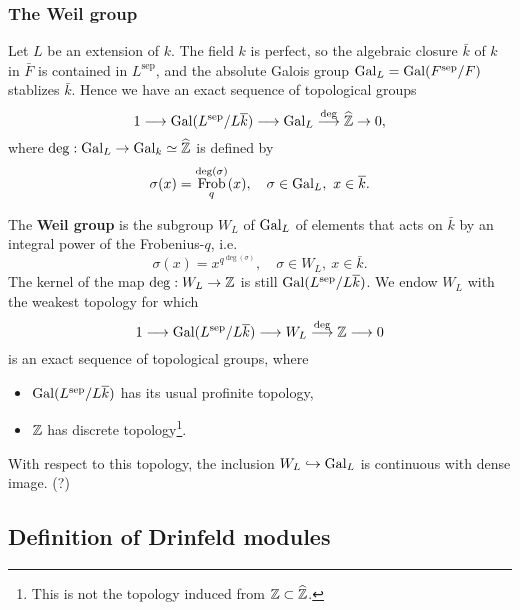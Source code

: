 \documentclass{article}
\newcommand{\sep}{\mathrm{sep}}
\DeclareMathOperator{\frob}{Frob}
\begin{document}
\subsubsection{The Weil group}
Let $L$ be an extension of $k$.
The field $k$ is perfect,
so the algebraic closure $\bar k$ of $k$ in $\bar F$ is contained in $L^\sep$,
and the absolute Galois group $\gal_L = \gal(F^\sep/F)$ stablizes $\bar k$.
Hence we have
an exact sequence of topological groups
\[1\longrightarrow\gal(L^\sep/L\bar{k})\longrightarrow \gal_L\stackrel{\deg}{\longrightarrow}\hat\Z\to 0,\]
where $\deg : \operatorname{Gal}_L\to \operatorname{Gal}_k\simeq\widehat{\mathbb{Z}}$ is defined by
\[\sigma(x) = \frob_q^{\deg(\sigma)}(x),\quad \sigma\in \gal_L,\ x\in\bar{k}.\]

The \textbf{Weil group} is the subgroup $W_L$ of $\operatorname{Gal}_L$ of elements that acts on $\bar{k}$ by an integral power of the Frobenius-$q$, i.e. \[\sigma(x) = x^{q^{\deg(\sigma)}},\quad \sigma\in W_L,\ x\in\bar{k}.\]
The kernel of the map $\deg : W_L\to\mathbb{Z}$ is still $\gal(L^\sep/L\bar{k})$.
We endow $W_L$ with the weakest topology for which
\[1\longrightarrow \gal(L^\sep/L\bar{k})\longrightarrow W_L\stackrel{\deg}{\longrightarrow} \Z\longrightarrow0\]
is an exact sequence of topological groups,
where \begin{itemize}
    \item $\gal(L^\sep/L\bar{k})$ has its usual profinite topology,
    \item $\mathbb{Z}$ has discrete topology\footnote{This is not the topology induced from $\mathbb{Z}\subset \widehat{\mathbb{Z}}$.}.
\end{itemize}
With respect to this topology,
the inclusion $W_L\hookrightarrow \operatorname{Gal}_L$ is continuous with dense image. (?)


\subsection{Definition of Drinfeld modules}
\end{document}
